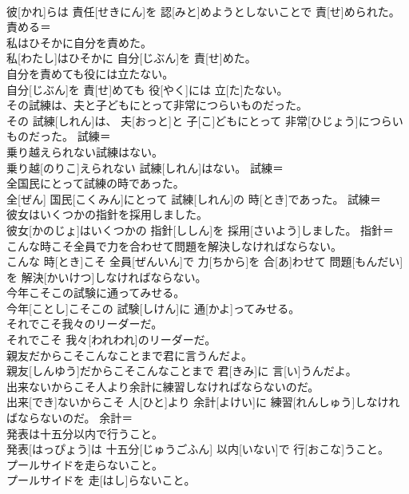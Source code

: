 \documentclass[8pt]{extreport}
\begin{document}
\begin{CJK}{UTF8}{min}
\\	彼[かれ]らは 責任[せきにん]を 認[みと]めようとしないことで 責[せ]められた。	責める＝ 
\\	私はひそかに自分を責めた。	
\\	私[わたし]はひそかに 自分[じぶん]を 責[せ]めた。	
\\	自分を責めても役には立たない。	
\\	自分[じぶん]を 責[せ]めても 役[やく]には 立[た]たない。	
\\	その試練は、夫と子どもにとって非常につらいものだった。	
\\	その 試練[しれん]は、 夫[おっと]と 子[こ]どもにとって 非常[ひじょう]につらいものだった。	試練＝ 
\\	乗り越えられない試練はない。	
\\	乗り越[のりこ]えられない 試練[しれん]はない。	試練＝ 
\\	全国民にとって試練の時であった。	
\\	全[ぜん] 国民[こくみん]にとって 試練[しれん]の 時[とき]であった。	試練＝ 
\\	彼女はいくつかの指針を採用しました。	
\\	彼女[かのじょ]はいくつかの 指針[ししん]を 採用[さいよう]しました。	指針＝ 
\\	こんな時こそ全員で力を合わせて問題を解決しなければならない。	
\\	こんな 時[とき]こそ 全員[ぜんいん]で 力[ちから]を 合[あ]わせて 問題[もんだい]を 解決[かいけつ]しなければならない。	
\\	今年こそこの試験に通ってみせる。	
\\	今年[ことし]こそこの 試験[しけん]に 通[かよ]ってみせる。	
\\	それでこそ我々のリーダーだ。	
\\	それでこそ 我々[われわれ]のリーダーだ。	
\\	親友だからこそこんなことまで君に言うんだよ。	
\\	親友[しんゆう]だからこそこんなことまで 君[きみ]に 言[い]うんだよ。	
\\	出来ないからこそ人より余計に練習しなければならないのだ。	
\\	出来[でき]ないからこそ 人[ひと]より 余計[よけい]に 練習[れんしゅう]しなければならないのだ。	余計＝ 
\\	発表は十五分以内で行うこと。	
\\	発表[はっぴょう]は 十五分[じゅうごふん] 以内[いない]で 行[おこな]うこと。	
\\	プールサイドを走らないこと。	
\\	プールサイドを 走[はし]らないこと。	

\end{CJK}
\end{document}
